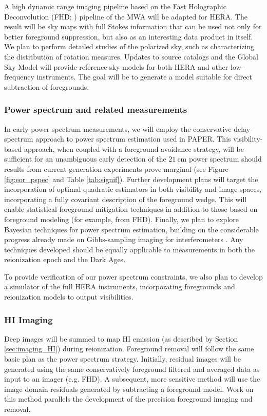 \documentclass[preprint]{aastex}
\begin{document}
A high dynamic range imaging pipeline based on the Fast Holographic Deconvolution (FHD; \citealt{sullivan_et_al2012}) pipeline of the MWA will be adapted for HERA.  The result will be sky maps with full Stokes information that can be used not only for better foreground suppression, but also as an interesting data product in itself.  We plan to perform detailed studies of the polarized sky, such as characterizing the distribution of rotation measures.  Updates to source catalogs and the Global Sky Model \citep{deoliveira2008} will provide reference sky models for both HERA and other low-frequency instruments. The goal will be to generate a model suitable for direct subtraction of foregrounds. 


\subsubsection{Power spectrum and related measurements}

In early power spectrum measurements, we will employ the conservative delay-spectrum approach to power spectrum estimation used in PAPER.  This visibility-based approach, when coupled with a foreground-avoidance strategy, will be sufficient for an unambiguous early detection of the $21~\textrm{cm}$ power spectrum should results from current-generation experiments prove marginal (see Figure \ref{fig:eor_pspec} and Table \ref{tab:signif}).  Further development plans will target the incorporation of optimal quadratic estimators \citep{liu_tegmark2011,dillon_et_al2013a} in both visibility and image spaces, incorporating a fully covariant description of the foreground wedge.  This will enable statistical foreground mitigation techniques in addition to those based on foreground modeling (for example, from FHD).  Finally, we plan to explore Bayesian techniques for power spectrum estimation, building on the considerable progress already made on Gibbs-sampling imaging for interferometers \cite{sutter_et_al2014}.  Any techniques developed should be equally applicable to measurements in both the reionization epoch and the Dark Ages.

To provide verification of our power spectrum constraints, we also plan to develop a simulator of the full HERA instruments, incorporating foregrounds and reionization models to output visibilities.

\subsubsection{HI Imaging}
Deep images will be summed to map HI emission (as described by Section \ref{sec:imaging_HI}) during reionization.   Foreground removal will follow the same basic plan as the power spectrum strategy.  Initially, residual images will be generated using the same conservatively foreground filtered and averaged data as input to an imager (e.g. FHD).  A subsequent, more sensitive method will use the image domain residuals generated by subtracting a foreground model.  Work on this method parallels the development of the precision foreground imaging and removal.
\end{document}
